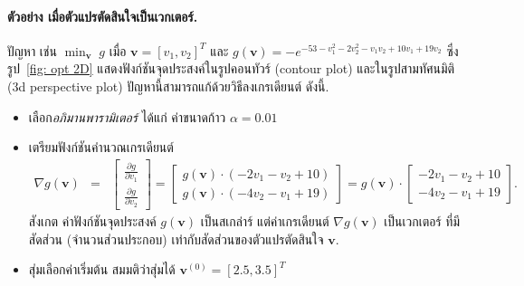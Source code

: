 \paragraph{ตัวอย่าง เมื่อตัวแปรตัดสินใจเป็นเวกเตอร์.}
ปัญหา เช่น $\min_{\bm{v}} \; g$ เมื่อ
$\bm{v} =[v_1, v_2]^T$
และ
$g(\bm{v}) = -e^{-53-v_1^2 -2v_2^2-v_1 v_2 + 10 v_1 + 19 v_2}$
ซึ่งรูป~\ref{fig: opt 2D} แสดงฟังก์ชันจุดประสงค์ในรูปคอนทัวร์ (contour plot) และในรูปสามทัศนมิติ (3d perspective plot)
ปัญหานี้สามารถแก้ด้วยวิธีลงเกรเดียนต์ ดังนี้.

	\begin{itemize}
	\item
	เลือก\textit{อภิมานพารามิเตอร์}
	ได้แก่ ค่าขนาดก้าว $\alpha = 0.01$

	\item 
	เตรียมฟังก์ชันคำนวณเกรเดียนต์
	\begin{eqnarray}
	\nabla g(\bm{v}) &=& 
	\begin{bmatrix}
	\frac{\partial g}{\partial v_1} \\
	\frac{\partial g}{\partial v_2}
	\end{bmatrix}
	= 
	\begin{bmatrix}
g(\bm{v}) \cdot (-2 v_1 - v_2 + 10) \\
g(\bm{v}) \cdot (-4 v_2 - v_1 + 19)
\end{bmatrix}
= g(\bm{v}) \cdot 
\begin{bmatrix}
-2 v_1 - v_2 + 10
\\
-4 v_2 - v_1 + 19
\end{bmatrix}
	\nonumber .  
	\end{eqnarray} 
สังเกต ค่าฟังก์ชันจุดประสงค์ $g(\bm{v})$ เป็นสเกล่าร์
แต่ค่าเกรเดียนต์ $\nabla g(\bm{v})$ เป็นเวกเตอร์ ที่มีสัดส่วน (จำนวนส่วนประกอบ) เท่ากับสัดส่วนของตัวแปรตัดสินใจ $\bm{v}$.
	
\item สุ่มเลือกค่าเริ่มต้น สมมติว่าสุ่มได้ $\bm{v}^{(0)} = [2.5, 3.5]^T$


\end{itemize}
